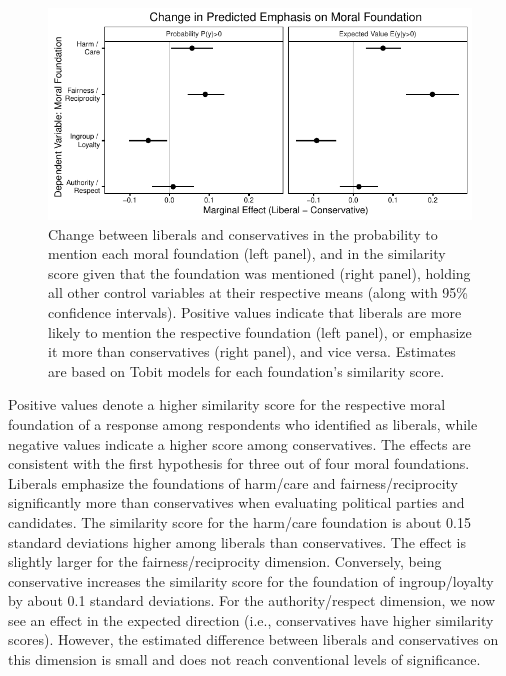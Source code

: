 \documentclass[12pt]{article}
\begin{document}
\begin{figure}[h]\centering
\includegraphics{../calc/fig/tobit_ideol.pdf}
\caption{Change between liberals and conservatives in the probability to mention each moral foundation (left panel), and in the similarity score given that the foundation was mentioned (right panel), holding all other control variables at their respective means (along with 95\% confidence intervals). Positive values indicate that liberals are more likely to mention the respective foundation (left panel), or emphasize it more than conservatives (right panel), and vice versa. Estimates are based on Tobit models for each foundation's similarity score. %
}\label{fig:tobit_ideol}
\end{figure}

Positive values denote a higher similarity score for the respective moral foundation of a response among respondents who identified as liberals, while negative values indicate a higher score among conservatives. The effects are consistent with the first hypothesis for three out of four moral foundations. Liberals emphasize the foundations of harm/care and fairness/reciprocity significantly more than conservatives when evaluating political parties and candidates. The similarity score for the harm/care foundation is about 0.15 standard deviations higher among liberals than conservatives. The effect is slightly larger for the fairness/reciprocity dimension. Conversely, being conservative increases the similarity score for the foundation of ingroup/loyalty by about 0.1 standard deviations. For the authority/respect dimension, we now see an effect in the expected direction (i.e., conservatives have higher similarity scores). However, the estimated difference between liberals and conservatives on this dimension is small and does not reach conventional levels of significance.
\end{document}
